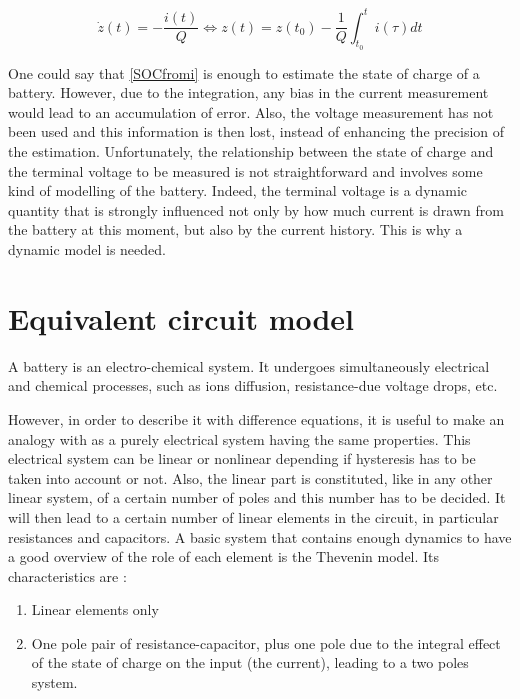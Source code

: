 \documentclass{article}
\begin{document}
\begin{equation}
    \dot{z}(t) = -\frac{i(t)}{Q} \Leftrightarrow z(t) = z(t_0) - \frac{1}{Q} \int_{t_0}^t i(\tau) dt
\label{SOCfromi}
\end{equation}

One could say that \ref{SOCfromi} is enough to estimate the state of charge of a battery. However, due to the integration, any bias in the current measurement would lead to an accumulation of error. Also, the voltage measurement has not been used and this information is then lost, instead of enhancing the precision of the estimation.
Unfortunately, the relationship between the state of charge and the terminal voltage to be measured is not straightforward and involves some kind of modelling of the battery. Indeed, the terminal voltage is a dynamic quantity that is strongly influenced not only by how much current is drawn from the battery at this moment, but also by the current history. This is why a dynamic model is needed. 


\section{Equivalent circuit model}

A battery is an electro-chemical system. It undergoes simultaneously electrical and chemical processes, such as ions diffusion, resistance-due voltage drops, etc. 

However, in order to describe it with difference equations, it is useful to make an analogy with as a purely electrical system having the same properties. This electrical system can be linear or nonlinear depending if hysteresis has to be taken into account or not. Also, the linear part is constituted, like in any other linear system, of a certain number of poles and this number has to be decided. It will then lead to a certain number of linear elements in the circuit, in particular resistances and capacitors. 
A basic system that contains enough dynamics to have a good overview of the role of each element is the Thevenin model. Its characteristics are : 

\begin{enumerate}
\item Linear elements only 
\item One pole pair of resistance-capacitor, plus one pole due to the integral effect of the state of charge on the input (the current), leading to a two poles system. 
\end{enumerate}
\end{document}
